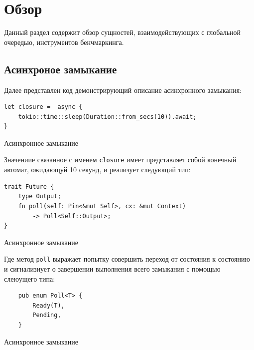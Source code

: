 
\section{Обзор}

Данный раздел содержит обзор сущностей, взаимодействующих с глобальной очередью, инструментов бенчмаркинга.

\subsection{Асинхроное замыкание}

Далее представлен код демонстрирующий описание асинхронного замыкания:

\begin{listing}[H]
    \begin{verbatim}
let closure =  async {
    tokio::time::sleep(Duration::from_secs(10)).await;
}
    \end{verbatim}

    \caption{Асинхронное замыкание}
    \label{listing:async_closure}
\end{listing}

Значениие связанное с именем \verb|closure| имеет представляет собой конечный автомат, ожидающуй 10 секунд, и реализует следующий тип:

\begin{listing}[H]
    \begin{verbatim}
trait Future {
    type Output;
    fn poll(self: Pin<&mut Self>, cx: &mut Context)
        -> Poll<Self::Output>;
}
    \end{verbatim}

    \caption{Асинхронное замыкание}
    \label{listing:future_trait}
\end{listing}

Где метод \verb|poll| выражает попытку совершить переход от состояния к состоянию и сигнализиует о завершении выполнения всего замыкания с помощью слеюущего типа:

\begin{listing}[H]
    \begin{verbatim}
    pub enum Poll<T> {
        Ready(T),
        Pending,
    }
    \end{verbatim}

    \caption{Асинхронное замыкание}
    \label{listing:future_trait}
\end{listing}

